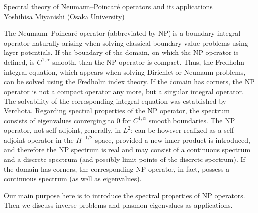 \documentclass[a4paper,reqno,12pt]{article}
\theoremstyle{plain}
\theoremstyle{definition}
\theoremstyle{remark}
\begin{document}
\begin{center}
\begin{Large}
Spectral theory of Neumann--Poincar\'e operators and its 
applications
\vspace{12pt}
\\
{\sc Yoshihisa Miyanishi} (Osaka University)
\end{Large}
\end{center}
%
%
\vspace{12pt}
\par
%
%
The Neumann--Poincar\'e operator (abbreviated by NP) is a boundary 
integral operator naturally arising when solving classical boundary 
value problems using layer potentials. If the boundary of the domain, 
on which the NP operator is defined, is $C^{1, \alpha}$ smooth, then 
the NP operator is compact. Thus, the Fredholm integral equation, 
which appears when solving Dirichlet or Neumann problems, can be 
solved using the Fredholm index theory. If the domain has corners, the 
NP operator is not a compact operator any more, but a singular 
integral operator. The solvability of the corresponding integral 
equation was established by Verchota.
 Regarding spectral properties of the NP operator, the spectrum 
consists of eigenvalues converging to $0$ for $C^{1, \alpha}$ smooth 
boundaries. The NP operator, not self-adjoint, generally, in $L^2$; 
can be however realized as a self-adjoint operator in the 
$H^{-1/2}$-space, provided a new inner product is introduced, and 
therefore the NP spectrum is real and may consist of a continuous 
spectrum and a discrete spectrum (and possibly limit points of the 
discrete spectrum). If the domain has corners, the corresponding NP 
operator, in fact, possess a continuous spectrum (as well as 
eigenvalues).
\par
 Our main purpose here is to introduce the spectral properties of NP 
operators. Then we discuss inverse problems and plasmon eigenvalues as 
applications.

%
%
%
%
\end{document}
